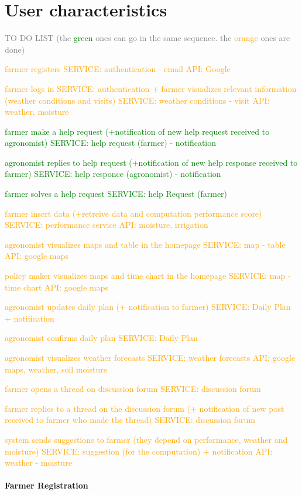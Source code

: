 \section{User characteristics}


\textcolor{gray}{TO DO LIST (the \textcolor{green} {green} ones can go in the same sequence. the \textcolor{orange}{orange} ones are done)
\begin{enumerate}
    \item \textcolor{orange}{farmer registers SERVICE: authentication - email API: Google}
    \item \textcolor{orange}{farmer logs in SERVICE: authentication + farmer visualizes relevant information (weather conditions and visits) SERVICE: weather conditions - visit API: weather, moisture}
    \textcolor{green}{
    \item farmer make a help request (+notification of new help request received to agronomist) SERVICE: help request (farmer) - notification
    \item agronomist replies to help request (+notification of new help response received to farmer) SERVICE: help responce (agronomist) - notification
    \item farmer solves a help request SERVICE: help Request (farmer)}
    \item \textcolor{orange}{farmer insert data (+retreive data and computation performance score) SERVICE: performance service API: moisture, irrigation}
    \item \textcolor{orange}{agronomist visualizes maps and table in the homepage SERVICE: map - table API: google maps}
    \item \textcolor{orange}{policy maker visualizes maps and time chart in the homepage SERVICE: map - time chart API: google maps}
    \textcolor{orange}{
    \item agronomist updates daily plan (+ notification to farmer) SERVICE: Daily Plan + notification}
    \item \textcolor{orange}{agronomist confirms daily plan SERVICE: Daily Plan}
    \item \textcolor{orange}{agronomist visualizes weather forecasts SERVICE: weather forecasts API: google maps, weather, soil moisture }
    \item \textcolor{orange}{farmer opens a thread on discussion forum SERVICE: discussion forum}
    \item \textcolor{orange}{farmer replies to a thread on the discussion forum (+ notification of new post received to farmer who made the thread) SERVICE: discussion forum}
    \item \textcolor{orange}{system sends suggestions to farmer (they depend on performance, weather and moisture) SERVICE: suggestion (for the computation) + notification API: weather - moisture}
\end{enumerate}
}

\paragraph{Farmer Registration}


\def\fillandplacepagenumber{%
 \par\pagestyle{empty}%
\vbox to 0pt{\vss}\vfill
\vbox to 0pt{\baselineskip0pt
   \hbox to\linewidth{\hss}%
   \setlength{\footskip}{70pt}
   \baselineskip\footskip
   \hbox to\linewidth{%
     \hfil\thepage\hfil}\vss}}








